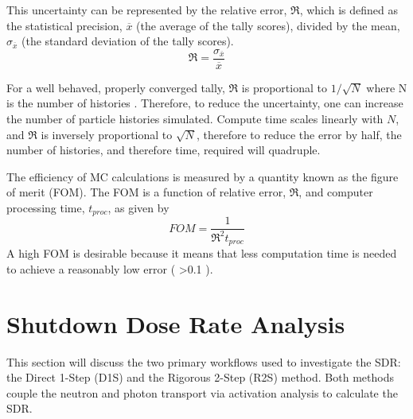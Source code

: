 This uncertainty can be represented by the relative error, $\Re$,
which is defined as the statistical precision, $\overline{x}$ (the average of
the tally scores), divided by the mean, $\sigma_{\overline{x}}$ (the standard
deviation of the tally scores).  
\begin{equation} \label{eq:1.2}
		\Re = \frac{\sigma_{\overline{x}}}{{\overline{x}}}
\end{equation}

For a well behaved, properly converged tally, $\Re$ is proportional
to $1/\sqrt{N}$ where N is the number
of histories \cite{mcnp_manual}.
Therefore, to reduce the uncertainty, one can 
increase the number of particle histories simulated.
Compute time scales linearly with $N$, and
$\Re$ is inversely proportional to $\sqrt{N}$, therefore to reduce the
error by half, the number of histories, and therefore time, required will
quadruple.  

The efficiency of MC calculations is measured by a quantity known as the figure of merit
(FOM).  The FOM is a function of relative error, $\Re$, and computer processing
time, $t_{proc}$, 
as given by
\begin{equation} \label{eq:1.3}
	FOM = \frac{1}{{{{\Re}^2}t_{proc}}}
\end{equation}
A high FOM is desirable because it means that less computation time is needed to achieve
a reasonably low error ( >0.1 \cite{mcnp_manual}).   

\section{Shutdown Dose Rate Analysis}\label{sec:sdr_calcs}
This section will discuss the two primary workflows used to investigate the SDR:
the Direct 1-Step (D1S) \cite{d1s} and the Rigorous 2-Step (R2S) \cite{r2s}
method.  Both methods couple the neutron and photon transport via activation
analysis to calculate the SDR.

